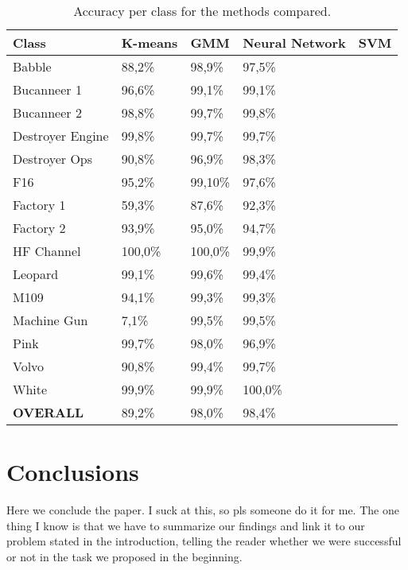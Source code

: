 \documentclass[12pt]{article}
\begin{document}
\begin{table}[ht]
\centering
\caption{Accuracy per class for the methods compared.}
\label{tab:acc}
\begin{tabular}{l|llll}
\hline
Class & K-means & GMM & Neural Network & SVM \\
\hline
Babble & 88,2\% & 98,9\% & 97,5\% &  \\
Bucanneer 1 & 96,6\% & 99,1\% & 99,1\% & \\
Bucanneer 2 & 98,8\% & 99,7\% & 99,8\% & \\
Destroyer Engine & 99,8\% & 99,7\% & 99,7\% & \\
Destroyer Ops & 90,8\% & 96,9\% & 98,3\% &\\
F16 & 95,2\% & 99,10\% & 97,6\% &\\
Factory 1 & 59,3\% & 87,6\% & 92,3\% &\\
Factory 2 & 93,9\% & 95,0\% & 94,7\% &\\
HF Channel & 100,0\% & 100,0\% & 99,9\% &\\
Leopard & 99,1\% & 99,6\% & 99,4\% &\\
M109 & 94,1\% & 99,3\% & 99,3\% &\\
Machine Gun & 7,1\% & 99,5\% & 99,5\% &\\
Pink & 99,7\% & 98,0\% & 96,9\% &\\
Volvo & 90,8\% & 99,4\% & 99,7\% &\\
White & 99,9\% & 99,9\% & 100,0\% &\\
\hline
\textbf{OVERALL} & 89,2\% & 98,0\% & 98,4\% & \\
\hline
\end{tabular}
\end{table}



\section{Conclusions} \label{conc}

Here we conclude the paper. I suck at this, so pls someone do it for me. The one thing I know is that we have to summarize our findings and link it to our problem stated in the introduction, telling the reader whether we were successful or not in the task we proposed in the beginning.


\end{document}
